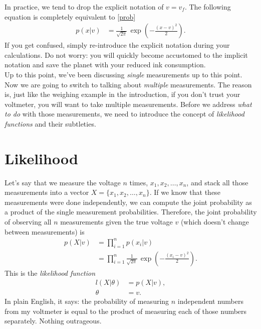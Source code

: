\documentclass[10pt,letterpaper]{article}
\begin{document}
In practice, we tend to drop the explicit notation of $v=v_f$. The following equation is completely equivalent to \cref{prob}
\begin{align}
	p(x \vert v) &= \frac{1}{\sqrt{2\pi}}\,\exp\left( -\frac{(x-v)^2}{2} \right).
\end{align}
If you get confused, simply re-introduce the explicit notation during your calculations. Do not worry: you will quickly become accustomed to the implicit notation and save the planet with your reduced ink consumption.\\

Up to this point, we've been discussing \emph{single} measurements up to this point. Now we are going to switch to talking about \emph{multiple} measurements. The reason is, just like the weighing example in the introduction, if you don't trust your voltmeter, you will want to take multiple measurements. Before we address \emph{what to do} with those measurements, we need to introduce the concept of \emph{likelihood functions} and their subtleties.\\

\section{Likelihood}

Let's say that we measure the voltage $n$ times, $x_1, x_2, \ldots, x_n$, and stack all those measurements into a vector $X = \{x_1, x_2, \ldots, x_n\}$. If we know that these measurements were done independently, we can compute the joint probability as a product of the single measurement probabilities. Therefore, the joint probability of observing all $n$ measurements given the true voltage $v$ (which doesn't change between measurements) is
\begin{align}
	p(X\vert v) &= \prod_{i=1}^n p(x_i|v)\\
				&= \prod_{i=1}^n \frac{1}{\sqrt{2\pi}}\,\exp\left( -\frac{(x_i-v)^2}{2} \right).\label{likelihood}
\end{align}
This is the \emph{likelihood function}
\begin{align}
	l(X \vert \theta) &= p(X \vert v),\\
	\theta &= v.
\end{align}
In plain English, it says: the probability of measuring $n$ independent numbers from my voltmeter is equal to the product of measuring each of those numbers separately. Nothing outrageous.\\
\end{document}
